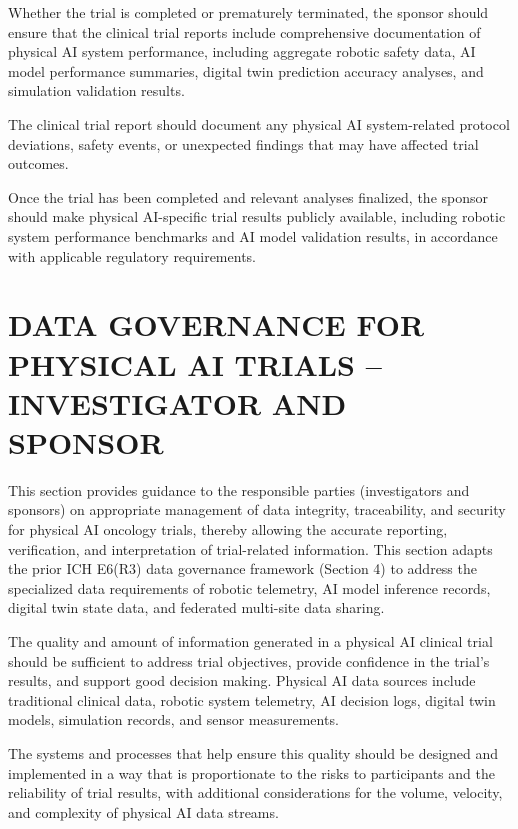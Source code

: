 \documentclass[11pt]{article}
\begin{document}
\begin{description}[leftmargin=2.5cm,style=sameline]

\item[(a)] Whether the trial is completed or prematurely terminated, the sponsor should ensure that the clinical trial reports include comprehensive documentation of physical AI system performance, including aggregate robotic safety data, AI model performance summaries, digital twin prediction accuracy analyses, and simulation validation results.

\item[(b)] The clinical trial report should document any physical AI system-related protocol deviations, safety events, or unexpected findings that may have affected trial outcomes.

\item[(c)] Once the trial has been completed and relevant analyses finalized, the sponsor should make physical AI-specific trial results publicly available, including robotic system performance benchmarks and AI model validation results, in accordance with applicable regulatory requirements.

\end{description}

\section{DATA GOVERNANCE FOR PHYSICAL AI TRIALS -- INVESTIGATOR AND SPONSOR}

This section provides guidance to the responsible parties (investigators and sponsors) on appropriate management of data integrity, traceability, and security for physical AI oncology trials, thereby allowing the accurate reporting, verification, and interpretation of trial-related information. This section adapts the prior ICH E6(R3) data governance framework (Section 4) to address the specialized data requirements of robotic telemetry, AI model inference records, digital twin state data, and federated multi-site data sharing.

The quality and amount of information generated in a physical AI clinical trial should be sufficient to address trial objectives, provide confidence in the trial's results, and support good decision making. Physical AI data sources include traditional clinical data, robotic system telemetry, AI decision logs, digital twin models, simulation records, and sensor measurements.

The systems and processes that help ensure this quality should be designed and implemented in a way that is proportionate to the risks to participants and the reliability of trial results, with additional considerations for the volume, velocity, and complexity of physical AI data streams.
\end{document}
